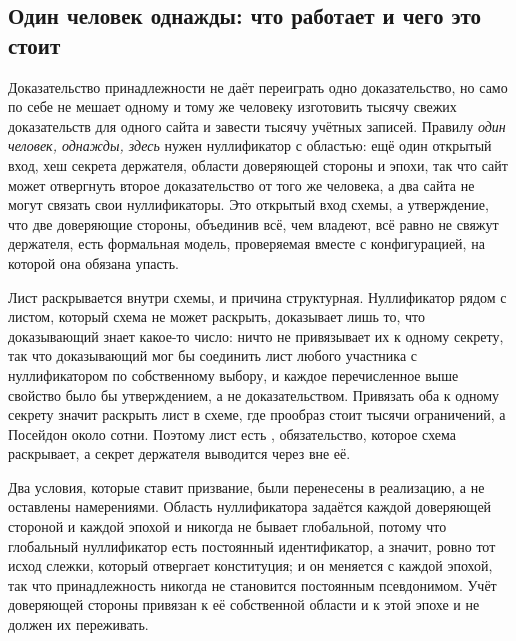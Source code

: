 \subsection{Один человек однажды: что работает и чего это стоит}

Доказательство принадлежности не даёт переиграть одно доказательство, но само по себе не мешает
одному и тому же человеку изготовить тысячу свежих доказательств для одного сайта и завести
тысячу учётных записей. Правилу \emph{один человек, однажды, здесь} нужен нуллификатор с
областью: ещё один открытый вход, хеш секрета держателя, области доверяющей стороны и эпохи, так
что сайт может отвергнуть второе доказательство от того же человека, а два сайта не могут связать
свои нуллификаторы. Это открытый вход схемы, а утверждение, что две доверяющие стороны, объединив
всё, чем владеют, всё равно не свяжут держателя, есть формальная модель, проверяемая вместе с
конфигурацией, на которой она обязана упасть. \sImpl

Лист раскрывается внутри схемы, и причина структурная. Нуллификатор рядом с листом, который схема не
может раскрыть, доказывает лишь то, что доказывающий знает какое-то число: ничто не привязывает их к
одному секрету, так что доказывающий мог бы соединить лист любого участника с нуллификатором по
собственному выбору, и каждое перечисленное выше свойство было бы утверждением, а не доказательством.
Привязать оба к одному секрету значит раскрыть лист в схеме, где прообраз  стоит тысячи
ограничений, а Посейдон около сотни. Поэтому лист есть ,
обязательство, которое схема раскрывает, а секрет держателя выводится через  вне её.

Два условия, которые ставит призвание, были перенесены в реализацию, а не оставлены намерениями.
Область нуллификатора задаётся каждой доверяющей стороной и каждой эпохой и никогда не бывает
глобальной, потому что глобальный нуллификатор есть постоянный идентификатор, а значит, ровно тот
исход слежки, который отвергает конституция; и он меняется с каждой эпохой, так что
принадлежность никогда не становится постоянным псевдонимом. Учёт доверяющей стороны привязан к её
собственной области и к этой эпохе и не должен их переживать.

